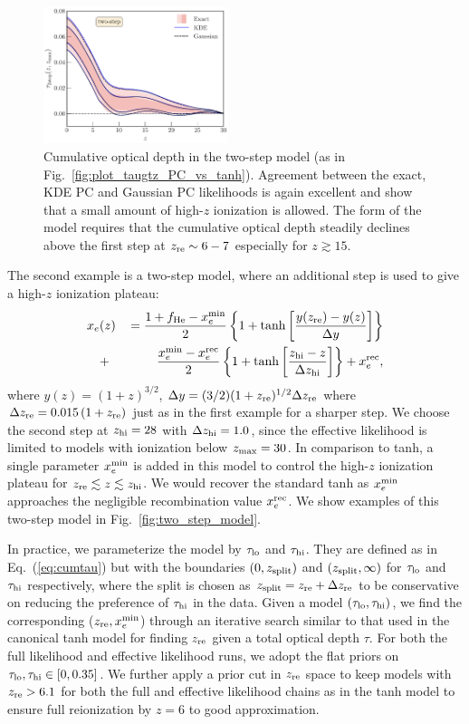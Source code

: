\documentclass[prd,twocolumn,amsmath,amssymb,floatfix,superscriptaddress,nofootinbib]{revtex4-1}
\newcommand{\refeq}[1]{Eq.~(\ref{eq:#1})}
\newcommand{\zmax}{z_{\rm max}}
\newcommand{\zre}{z_{\rm re}}
\newcommand{\xemin}{x_e^{\rm min}}
\newcommand{\tauhi}{\tau_{\rm hi}}
\newcommand{\taulo}{\tau_{\rm lo}}
\newcommand{\bea}{\begin{eqnarray}}
\newcommand{\eea}{\end{eqnarray}}
\begin{document}
\begin{figure}
\includegraphics[width=0.48\textwidth]
{paper/plots/pl18_taugtz_tanh_highz_direct_vs_kde_vs_gaussian.pdf}
\caption{Cumulative optical depth in the two-step model (as in Fig.~\ref{fig:plot_taugtz_PC_vs_tanh}).  Agreement between the exact, KDE PC and Gaussian PC likelihoods is again excellent and show that a small amount of high-$z$ ionization is allowed. The form of the model requires that the cumulative optical depth steadily declines above the first step at $z_{\rm re} \sim 6-7$ especially for $z\gtrsim 15$.
}
\label{fig:plot_taugtz_two_step_contours}
\end{figure}
 
The second example is a two-step model, where an additional step is used to give a high-$z$ ionization plateau: 
 \bea
x_e&(z)&\,= \frac{1+f_{\rm He} - \xemin}{2}\left\{  1+ \tanh\left[ \frac{y(z_{\rm re})-y(z)}{\Delta y} \right] \right\} \notag \\
&+& \frac{\xemin - x_e^{\rm rec}}{2}\left\{  1+ \tanh\left[ \frac{z_{\rm hi}-z}{\Delta z_{\rm hi}} \right] \right\} + x_e^{\rm rec},
 \label{eqn:tanh_highz}
 \eea
where $y(z)=(1+z)^{3/2}$, $\Delta y=(3/2)(1+z_{\rm re})^{1/2}\Delta z_{\rm re}$ where $\Delta z_{\rm re} = 0.015\, (1+z_{\rm re})$ just as in the first example for a sharper step.
We choose the second step at $z_{\rm hi}=28$ with $\Delta z_{\rm hi} = 1.0$, since the effective likelihood is limited to models with ionization below $\zmax=30$. 
In comparison to tanh, a single parameter $\xemin$ is added in this model to control the high-$z$ ionization plateau for $z_{\rm re} \lesssim z \lesssim z_{\rm hi}$. We would recover the standard tanh as $\xemin$ approaches the negligible recombination value $x_e^{\rm rec}$. We show examples
of this two-step model in Fig.~\ref{fig:two_step_model}.



In practice, we parameterize the model by $\taulo$ and $\tauhi$.  They are defined as in \refeq{cumtau} but with the boundaries $(0, z_{\rm split})$ and $(z_{\rm split}, \infty)$ for $\taulo$ and $\tauhi$ respectively, where the split is chosen as $z_{\rm split} = \zre + \Delta z_{\rm re}$ to be conservative on reducing the preference of $\tauhi$ in the data. 
Given a model $(\taulo, \tauhi)$, we find the corresponding ($\zre, \xemin$) through an iterative search similar to that used in the canonical tanh model for finding $\zre$ given a total optical depth $\tau$. 
For both the full likelihood and effective likelihood runs, we adopt the flat priors on $\taulo, \tauhi \in [0, 0.35]$.
We further apply a prior cut in $\zre$ space to keep models with $\zre > 6.1$ for both the full and effective likelihood chains as in the tanh model to ensure full reionization by $z = 6$ to good approximation. 
\end{document}
